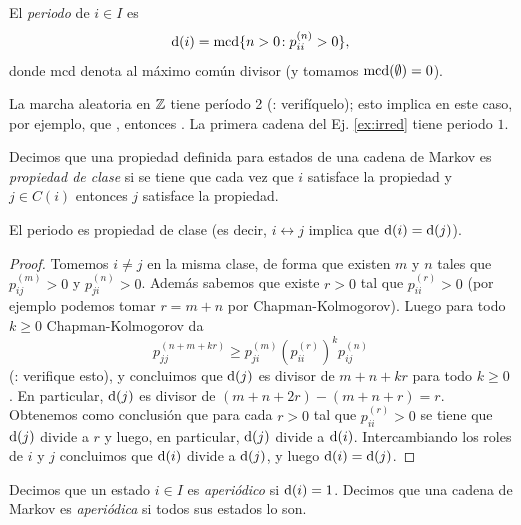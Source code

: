\begin{defn}
El \emph{periodo} de $i\in I$ es
\[\mathrm{d}(i)=\text{\upshape{mcd}}\{n>0\!:p^{(n)}_{ii}>0\},\]
donde mcd denota al máximo común divisor (y tomamos $\text{\upshape{mcd}}(\emptyset)=0$).
\end{defn}

\begin{ex}\label{ex:periodo}
La marcha aleatoria en $\mathbb{Z}$ tiene período 2 (\uexers: verifíquelo); esto implica en este caso, por ejemplo, que , entonces .
La primera cadena del Ej. \ref{ex:irred} tiene periodo $1$.
\end{ex}

\begin{defn}
Decimos que una propiedad definida para estados de una cadena de Markov es \emph{propiedad de clase} si se tiene que cada vez que $i$ satisface la propiedad y $j\in C(i)$ entonces $j$ satisface la propiedad.
\end{defn}

\begin{prop}\label{prop:periodo-clase}
El periodo es propiedad de clase (es decir, $i\leftrightarrow j$ implica que $\mathrm{d}(i)=\mathrm{d}(j)$).
\end{prop}

\begin{proof}
Tomemos $i\neq j$ en la misma clase, de forma que existen $m$ y $n$ tales que $p^{(m)}_{ij}>0$ y $p^{(n)}_{ji}>0$.
Además sabemos que existe $r>0$ tal que $p^{(r)}_{ii}>0$ (por ejemplo podemos tomar $r=m+n$ por Chapman-Kolmogorov).
Luego para todo $k\geq0$ Chapman-Kolmogorov da
\[p^{(n+m+kr)}_{jj}\geq p^{(m)}_{ji}(p^{(r)}_{ii})^kp^{(n)}_{ij}\]
(\uexers: verifique esto), y concluimos que $\mathrm{d}(j)$ es divisor de $m+n+kr$ para todo $k\geq0$.
En particular, $\mathrm{d}(j)$ es divisor de $(m+n+2r)-(m+n+r)=r$.
Obtenemos como conclusión que para cada $r>0$ tal que $p^{(r)}_{ii}>0$ se tiene que $\mathrm{d}(j)$ divide a $r$ y luego, en particular, $\mathrm{d}(j)$ divide a $\mathrm{d}(i)$.
Intercambiando los roles de $i$ y $j$ concluimos que $\mathrm{d}(i)$ divide a $\mathrm{d}(j)$, y luego $\mathrm{d}(i)=\mathrm{d}(j)$.
\end{proof}

\begin{defn}
Decimos que un estado $i\in I$ es \emph{aperiódico} si $\mathrm{d}(i)=1$.
Decimos que una cadena de Markov es \emph{aperiódica} si todos sus estados lo son.
\end{defn}

